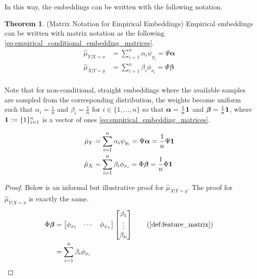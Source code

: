 \documentclass[twoside]{article} \usepackage{aistats2017}
\theoremstyle{definition}
\newtheorem{theorem}{Theorem}[section]
\newcommand{\rv}[1]{{#1}}
\newcommand{\hatmuX}{\hat{\mu}_{\rv{X}}}
\newcommand{\hatmuY}{\hat{\mu}_{\rv{Y}}}
\newcommand{\hatmuYx}{\hat{\mu}_{\rv{Y} | \rv{X} = x}}
\newcommand{\hatmuXy}{\hat{\mu}_{\rv{X} | \rv{Y} = y}}
\begin{document}
		In this way, the embeddings can be written with the following notation.
		
		\begin{theorem} \label{thm:empirical_embedding_matrices}
		(Matrix Notation for Empirical Embeddings)
		Empirical embeddings can be written with matrix notation as the following \eqref{eq:empirical_conditional_embedding_matrices}.
		\begin{equation}
		\begin{aligned}
			\hatmuYx &= \sum_{i = 1}^{n} \alpha_{i} \psi_{y_{i}} = \Psi \bm{\alpha} \\
			\hatmuXy &= \sum_{i = 1}^{n} \beta_{i} \phi_{x_{i}} = \Phi \bm{\beta} \\
		\label{eq:empirical_conditional_embedding_matrices}
		\end{aligned}
		\end{equation}
		
		Note that for non-conditional, straight embeddings where the available samples are sampled from the corresponding distribution, the weights become uniform such that $\alpha_{i} = \frac{1}{n}$ and $\beta_{i} = \frac{1}{n}$ for $i \in \{1, \dots, n\}$ so that $\bm{\alpha} = \frac{1}{n} \mathbf{1}$ and $\bm{\beta} = \frac{1}{n} \mathbf{1}$, where $\mathbf{1} := \{1\}_{i = 1}^{n}$ is a vector of ones \eqref{eq:empirical_embedding_matrices}.
		
		\begin{equation}
		\begin{aligned}
			\hatmuY &= \sum_{i = 1}^{n} \alpha_{i} \psi_{y_{i}} = \Psi \bm{\alpha} = \frac{1}{n} \Psi \bvec{1} \\
			\hatmuX &= \sum_{i = 1}^{n} \beta_{i} \phi_{x_{i}} = \Phi \bm{\beta} = \frac{1}{n} \Phi \bvec{1} \\
		\label{eq:empirical_embedding_matrices}
		\end{aligned}
		\end{equation}
		
		\begin{proof}
			Below is an informal but illustrative proof for $\hatmuXy$. The proof for $\hatmuYx$ is exactly the same.
			\begin{align*}
				\Phi \bm{\beta} &= \begin{bmatrix} \phi_{x_{1}} & \cdots & \phi_{x_{n}} \end{bmatrix} \begin{bmatrix} \beta_{1} \\ \vdots \\ \beta_{n} \end{bmatrix} \tag{\cref{def:feature_matrix}} \\
				&= \sum_{i = 1}^{n} \beta_{i} \phi_{x_{i}}
			\end{align*}
		\end{proof}
		\end{theorem}
		
\end{document}
